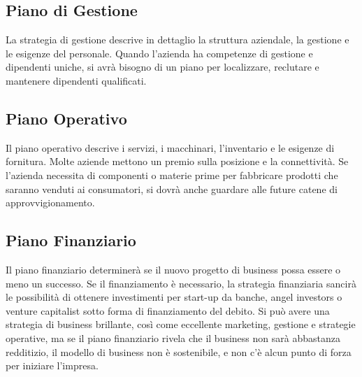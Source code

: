 \documentclass[a4paper, 12pt]{article}
\begin{document}
        \subsection{Piano di Gestione}
            La strategia di gestione descrive in dettaglio la struttura aziendale, la gestione e le esigenze del personale.
            Quando l’azienda ha competenze di gestione e dipendenti uniche, si avrà bisogno di un piano per localizzare, reclutare e mantenere dipendenti qualificati.
        
        \subsection{Piano Operativo}
            Il piano operativo descrive i servizi, i macchinari, l'inventario e le esigenze di fornitura.
            Molte aziende mettono un premio sulla posizione e la connettività.
            Se l’azienda necessita di componenti o materie prime per fabbricare prodotti che saranno venduti ai consumatori, si dovrà anche guardare alle future catene di approvvigionamento.
            
        \subsection{Piano Finanziario}
        Il piano finanziario determinerà se il nuovo progetto di business possa essere o meno un successo.
        Se il finanziamento è necessario, la strategia finanziaria sancirà le possibilità di ottenere investimenti per start-up da banche, angel investors o venture capitalist sotto forma di finanziamento del debito.
        Si può avere una strategia di business brillante, così come eccellente marketing, gestione e strategie operative, ma se il piano finanziario rivela che il business non sarà abbastanza redditizio, il modello di business non è sostenibile, e non c'è alcun punto di forza per iniziare l'impresa.
\end{document}
